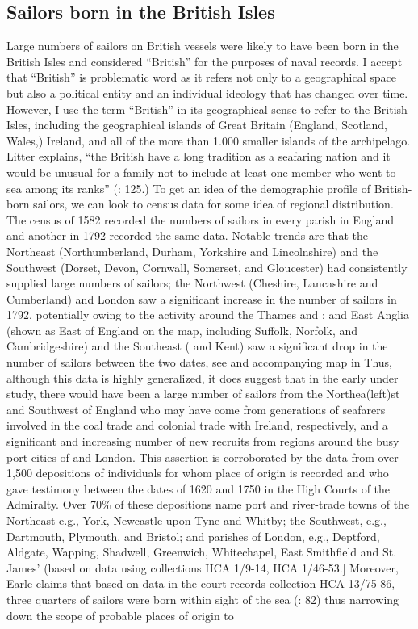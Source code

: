 \subsection{{Sailors born in the British Isles} }\label{sec:3.9.2}


Large numbers of sailors on British vessels were likely to have been born in the British Isles and considered “British” for the purposes of naval records. I accept that “British” is problematic word as it refers not only to a geographical space but also a political entity and an individual ideology that has changed over time. However, I use the term “British” in its geographical sense to refer to the British Isles, including the geographical islands of Great Britain (England, Scotland, Wales,) Ireland, and all of the more than 1.000 smaller islands of the archipelago. Litter explains, “the British have a long tradition as a seafaring nation and it would be unusual for a family not to include at least one member who went to sea among its ranks” (\citeyear*{Litter1999}: 125.) To get an idea of the demographic profile of British-born sailors, we can look to census data for some idea of regional distribution. The census of 1582 recorded the numbers of sailors in every parish in England \citep[246]{Bicheno2012} and another in 1792 recorded the same data. Notable trends are that the Northeast (Northumberland, Durham, Yorkshire and Lincolnshire) and the Southwest (Dorset, Devon, Cornwall, Somerset, and Gloucester) had consistently supplied large numbers of sailors; the Northwest (Cheshire, Lancashire and Cumberland) and London saw a significant increase in the number of sailors in 1792, potentially owing to the activity around the Thames and ; and East Anglia (shown as East of England on the map, including Suffolk, Norfolk, and Cambridgeshire) and the Southeast ( and Kent) saw a significant drop in the number of sailors between the two dates, see  and accompanying map in  Thus, although this data is highly generalized, it does suggest that in the early  under study, there would have been a large number of sailors from the Northea(left)st and Southwest of England who may have come from generations of seafarers involved in the coal trade and colonial trade with Ireland, respectively, and a significant and increasing number of new recruits from regions around the busy port cities of  and London. This assertion is corroborated by the data from over 1,500 depositions of individuals for whom place of origin is recorded and who gave testimony between the dates of 1620 and 1750 in the High Courts of the Admiralty. Over 70\% of these depositions name port and river-trade towns of the Northeast e.g., York, Newcastle upon Tyne and Whitby; the Southwest, e.g., Dartmouth, Plymouth, and Bristol; and parishes of London, e.g., Deptford, Aldgate, Wapping, Shadwell, Greenwich, Whitechapel, East Smithfield and St. James’ (based on  data using collections HCA 1/9-14, HCA 1/46-53.] Moreover, Earle claims that based on data in the court records collection HCA 13/75-86, three quarters of sailors were born within sight of the sea (\citeyear*{Earle1993}: 82) thus narrowing down the scope of probable places of origin to 